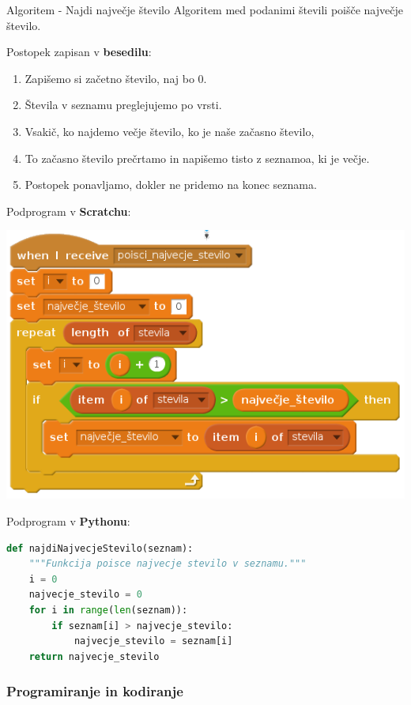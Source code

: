 \begin{examplebox}[label={prog:al01}]{Algoritem - Najdi največje število}
Algoritem med podanimi števili poišče največje število.

Postopek zapisan v \textbf{besedilu}:
\begin{enumerate}
\tightlist
\item Zapišemo si začetno število, naj bo $0$.
\item Števila v seznamu preglejujemo po vrsti.
\item Vsakič, ko najdemo večje število, ko je naše začasno število,
\item To začasno število prečrtamo in napišemo tisto z seznamoa, ki je
  večje.
\item Postopek ponavljamo, dokler ne pridemo na konec seznama.
\end{enumerate}


Podprogram v \textbf{Scratchu}:

    \includegraphics [width=0.6\linewidth, keepaspectratio =
    1] {./images/scratchImg/01-Scr_Alg-NajvecjeSt-img_trs.png}

Podprogram v \textbf{Pythonu}:

\begin{lstlisting}[language=Python]
def najdiNajvecjeStevilo(seznam):
    """Funkcija poisce najvecje stevilo v seznamu."""
    i = 0
    najvecje_stevilo = 0
    for i in range(len(seznam)):
        if seznam[i] > najvecje_stevilo:
            najvecje_stevilo = seznam[i]
    return najvecje_stevilo
\end{lstlisting}
\end{examplebox}



\subsubsection{Programiranje in kodiranje}
\label{sec:programiranje_kodiranje}

